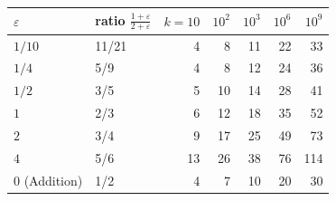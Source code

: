 {\small
\begin{tabular}{@{}llrrrrr@{}}
\toprule
$\varepsilon$ & ratio $\frac{1+\varepsilon}{2+\varepsilon}$ & $k=10$ & $10^2$ & $10^3$ & $10^6$ & $10^9$ \\
\midrule
$1/10$ & 11/21 & 4 & 8 & 11 & 22 & 33 \\
$1/4$ & 5/9 & 4 & 8 & 12 & 24 & 36 \\
$1/2$ & 3/5 & 5 & 10 & 14 & 28 & 41 \\
$1$ & 2/3 & 6 & 12 & 18 & 35 & 52 \\
$2$ & 3/4 & 9 & 17 & 25 & 49 & 73 \\
$4$ & 5/6 & 13 & 26 & 38 & 76 & 114 \\
$0$ (Addition) & 1/2 & 4 & 7 & 10 & 20 & 30 \\
\bottomrule
\end{tabular}}
